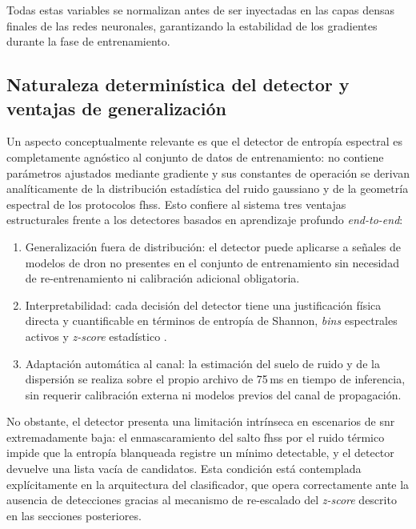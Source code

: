 Todas estas variables se normalizan antes de ser inyectadas en las capas densas finales de las redes neuronales, garantizando la estabilidad de los gradientes durante la fase de entrenamiento.

\subsection{Naturaleza determinística del detector y ventajas de generalización}
\label{subsec:detector_deterministico}

Un aspecto conceptualmente relevante es que el detector de entropía espectral es completamente agnóstico al conjunto de datos de entrenamiento: no contiene parámetros ajustados mediante gradiente y sus constantes de operación se derivan analíticamente de la distribución estadística del ruido gaussiano y de la geometría espectral de los protocolos \gls{fhss}. Esto confiere al sistema tres ventajas estructurales frente a los detectores basados en aprendizaje profundo \textit{end-to-end}:

\begin{enumerate}\itemsep 0em
    \item Generalización fuera de distribución: el detector puede aplicarse a señales de modelos de dron no presentes en el conjunto de entrenamiento sin necesidad de re-entrenamiento ni calibración adicional obligatoria.
    \item Interpretabilidad: cada decisión del detector tiene una justificación física directa y cuantificable en términos de entropía de Shannon, \textit{bins} espectrales activos y \textit{z-score} estadístico \cite{fu_radio_2024}.
    \item Adaptación automática al canal: la estimación del suelo de ruido y de la dispersión se realiza sobre el propio archivo de 75\,ms en tiempo de inferencia, sin requerir calibración externa ni modelos previos del canal de propagación.
\end{enumerate}

No obstante, el detector presenta una limitación intrínseca en escenarios de \gls{snr} extremadamente baja: el enmascaramiento del salto \gls{fhss} por el ruido térmico impide que la entropía blanqueada registre un mínimo detectable, y el detector devuelve una lista vacía de candidatos. Esta condición está contemplada explícitamente en la arquitectura del clasificador, que opera correctamente ante la ausencia de detecciones gracias al mecanismo de re-escalado del \textit{z-score} descrito en las secciones posteriores.

